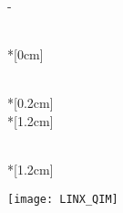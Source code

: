 \thispagestyle{empty}             %
\calccentering{\unitlength}
\begin{adjustwidth*}{\unitlength}{-\unitlength}
    \begin{adjustwidth}{-0.5cm}{-0.5cm}
        \sffamily
        \begin{flushright}
            \thesistypeabbr{} \\*[0cm]
            \thesistype{}\\
        \end{flushright}
        \vspace*{\fill}
        \noindent
        \HUGE \thesistitle{}\\*[0.2cm]
        \Huge \thesissubtitle{}\\*[1.2cm]
        \parbox[b]{0.5\linewidth}{%
            \LARGE 
            \thesisauthor{}\\*[1.2cm]
            \Large
            \thesislocation{} \the\year
        }
        \hfill\texttt{[image: LINX\_QIM]}
    \end{adjustwidth}
\end{adjustwidth*}
\normalfont
\normalsize
